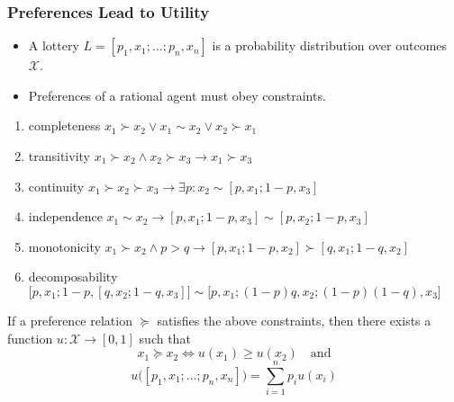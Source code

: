 \documentclass[UTF8,11pt,colorlinks,compress,openany]{beamer}%
\begin{document}
\begin{frame}\frametitle{Preferences Lead to Utility}
\setlength\abovedisplayskip{0pt}
\setlength\belowdisplayskip{0pt}\vspace*{-2pt}
\begin{itemize}
	\item A lottery $L=[p_1,x_1;\dots;p_n,x_n]$ is a probability distribution over outcomes $\mathcal{X}$.
	\item Preferences of a rational agent must obey constraints.
\end{itemize}
\begin{enumerate}
	\item completeness $x_1\succ x_2\vee x_1\sim x_2\vee x_2\succ x_1$
	\item transitivity $x_1\succ x_2\wedge x_2\succ x_3\to x_1\succ x_3$
	\item continuity $x_1\succ x_2\succ x_3\to\exists p: x_2\sim[p,x_1;1-p,x_3]$
	\item independence $x_1\sim x_2\to[p,x_1;1-p,x_3]\sim[p,x_2;1-p,x_3]$
	\item monotonicity $x_1\succ x_2\wedge p>q\to[p,x_1;1-p,x_2]\succ[q,x_1;1-q,x_2]$
	\item decomposability $\big[p,x_1;1-p,[q,x_2;1-q,x_3]\big]\sim\big[p,x_1;(1-p)q,x_2;(1-p)(1-q),x_3\big]$
\end{enumerate}\vspace*{-2pt}
\begin{theorem}
If a preference relation $\succeq$ satisfies the above constraints, then there exists a function $u:\mathcal{X}\to[0,1]$ such that
\[x_1\succeq x_2\iff u(x_1)\geq u(x_2)\quad\mbox{and}\]
\[u\big([p_1,x_1;\dots;p_n,x_n]\big)=\sum\limits_{i=1}^n p_i u(x_i)\]
\end{theorem}
\end{frame}
\end{document}

